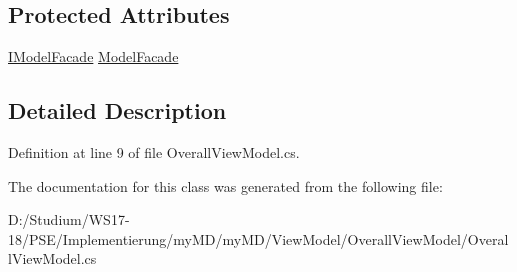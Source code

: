 \subsection*{Protected Attributes}
\begin{CompactItemize}
\item 
\hypertarget{classmy_m_d_1_1_view_model_1_1_overall_view_model_1_1_overall_view_model_a4999b8a64b668fdc70899f1d0452c0f}{
\hyperlink{interfacemy_m_d_1_1_model_interface_1_1_model_facade_interface_1_1_i_model_facade}{IModel\-Facade} \hyperlink{classmy_m_d_1_1_view_model_1_1_overall_view_model_1_1_overall_view_model_a4999b8a64b668fdc70899f1d0452c0f}{Model\-Facade}}
\label{dd/d0e/classmy_m_d_1_1_view_model_1_1_overall_view_model_1_1_overall_view_model_a4999b8a64b668fdc70899f1d0452c0f}

\end{CompactItemize}


\subsection{Detailed Description}




Definition at line 9 of file Overall\-View\-Model.cs.

The documentation for this class was generated from the following file:\begin{CompactItemize}
\item 
D:/Studium/WS17-18/PSE/Implementierung/my\-MD/my\-MD/View\-Model/Overall\-View\-Model/Overall\-View\-Model.cs\end{CompactItemize}
